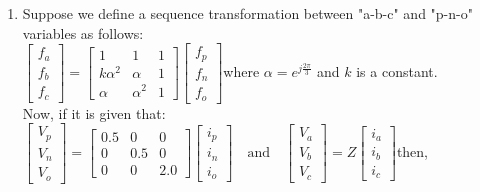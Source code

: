 \documentclass[journal]{IEEEtran}
\numberwithin{equation}{enumi}
\numberwithin{figure}{enumi}
\begin{document}
\begin{enumerate}
\begin{figure}[!ht]
    \centering
    \texttt{[image: figs/13.png]}
    \caption{}
    \label{fig:13}
\end{figure}
\begin{multicols}{4}
\begin{enumerate}
    \item $0.87$
    \item $0.74$
    \item $0.67$
    \item $0.54$
\end{enumerate}
\end{multicols}
    \bigskip
    \item Suppose we define a sequence transformation between "a-b-c" and "p-n-o" variables as follows:\\$\begin{bmatrix}f_a \\f_b \\f_c\end{bmatrix}=\begin{bmatrix}1 & 1 & 1 \\k\alpha^2 & \alpha & 1 \\\alpha & \alpha^2 & 1\end{bmatrix}\begin{bmatrix}f_p \\f_n \\f_o\end{bmatrix}$where $ \alpha = e^{j\frac{2\pi}{3}} $ and $ k $ is a constant.\\Now, if it is given that:$\begin{bmatrix}V_p \\V_n \\V_o\end{bmatrix}=\begin{bmatrix}
    0.5 & 0 & 0 \\
    0 & 0.5 & 0 \\
    0 & 0 & 2.0
    \end{bmatrix}\begin{bmatrix}i_p \\i_n \\i_o\end{bmatrix}\quad \text{and} \quad\begin{bmatrix}V_a \\V_b \\V_c\end{bmatrix}= Z\begin{bmatrix}i_a \\i_b \\i_c\end{bmatrix}$then,

\end{enumerate}
\end{document}

